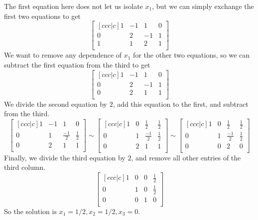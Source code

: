 The first equation here does not let us isolate $x_1$, but we can simply exchange the first two equations to get \[
\begin{bmatrix}[ccc|c]
	1 & -1 & 1 & 0\\
	0&2&-1&1\\
	1& 1 & 2 & 1\\
\end{bmatrix}
\]
We want to remove any dependence of $x_1$ for the other two equations, so we can subtract the first equation from the third to get \[
	\begin{bmatrix}[ccc|c]
		1 & -1 & 1 & 0\\
		0&2&-1&1\\
		0& 2 & 1 & 1\\
	\end{bmatrix}
\]
We divide the second equation by $2$, add this equation to the first, and subtract from the third.
\[
	\begin{bmatrix}[ccc|c]
		1 & -1 & 1 & 0\\
		0&1&\frac{-1}{2}&\frac{1}{2}\\
		0& 2 & 1 & 1\\
	\end{bmatrix} \sim
	\begin{bmatrix}[ccc|c]
		1 & 0 & \frac{1}{2} & \frac{1}{2}\\
		0&1&\frac{-1}{2}&\frac{1}{2}\\
		0& 2 & 1 & 1\\
	\end{bmatrix}
	\sim
	\begin{bmatrix}[ccc|c]
		1 & 0 & \frac{1}{2} & \frac{1}{2}\\
		0&1&\frac{-1}{2}&\frac{1}{2}\\
		0& 0 & 2 & 0\\
	\end{bmatrix}
\]
Finally, we divide the third equation by $2$, and remove all other entries of the third column.
\[
	\begin{bmatrix}[ccc|c]
		1 & 0 & 0& \frac{1}{2}\\
		0&1&0&\frac{1}{2}\\
		0& 0 & 1 & 0\\
	\end{bmatrix}
\]
So the solution is $x_1=1/2, x_2=1/2, x_3=0$.
